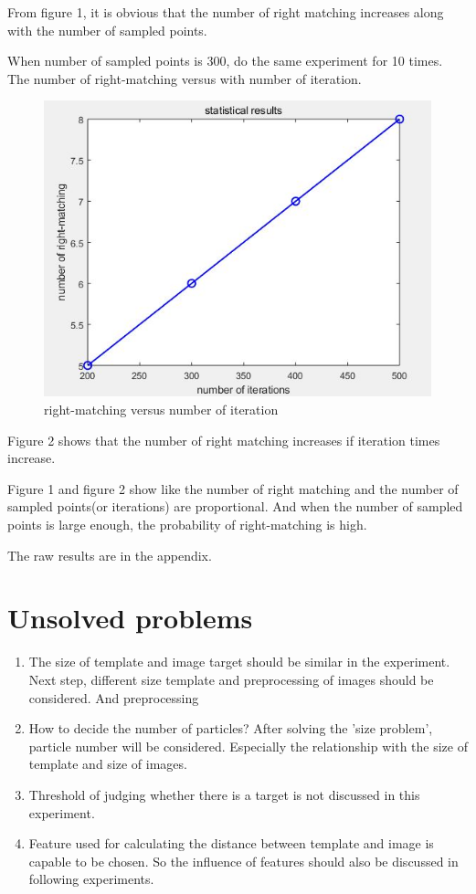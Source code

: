 From figure 1, it is obvious that the number of right matching increases along with the number of sampled points.

When number of sampled points is 300, do the same experiment for 10 times. The number of right-matching versus with number of iteration.

\begin{figure}[H]
\centering%
\includegraphics[width=5in]{pointD.jpg}
\caption{right-matching versus number of iteration}
\label{Fig.2}
\end{figure}

Figure 2 shows that the number of right matching increases if iteration times increase.

Figure 1 and figure 2 show like the number of right matching and the number of sampled points(or iterations) are proportional. And when the number of sampled points is large enough, the probability of right-matching is high.

The raw results are in the appendix.

\section{Unsolved problems}

\begin{enumerate}
  \item The size of template and image target should be similar in the experiment. Next step, different size template and preprocessing of images should be considered. And preprocessing
  \item How to decide the number of particles? After solving the 'size problem', particle number will be considered. Especially the relationship with the size of template and size of images.
  \item Threshold of judging whether there is a target is not discussed in this experiment.
  \item Feature used for calculating the distance between template and image is capable to be chosen. So the influence of features should also be discussed in following experiments.

\end{enumerate}


